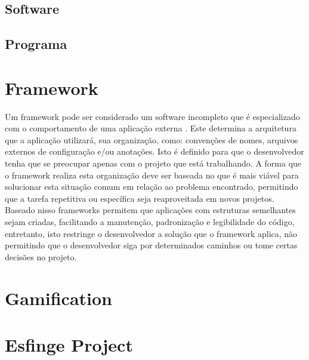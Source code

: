 \subsection{Software}

\subsection{Programa}

\section{Framework}

\par Um framework pode ser considerado um software incompleto que é especializado com o comportamento de uma aplicação externa \cite{johnson1988designing}. Este determina a arquitetura que a aplicação utilizará, sua organização, como: convenções de nomes, arquivos externos de configuração e/ou anotações. Isto é definido para que o desenvolvedor tenha que se preocupar apenas com o projeto que está trabalhando. A forma que o framework realiza esta organização deve ser baseada no que é mais viável para solucionar esta situação comum em relação ao problema encontrado, permitindo que a tarefa repetitiva ou específica seja reaproveitada em novos projetos.
Baseado nisso frameworks permitem que aplicações com estruturas semelhantes sejam criadas, facilitando a manutenção, padronização e legibilidade do código, entretanto, isto restringe o desenvolvedor a solução que o framework aplica, não permitindo que o desenvolvedor siga por determinados caminhos ou tome certas decisões no projeto.\cite{gamma2009padroes}

\section{Gamification}

\section{Esfinge Project}